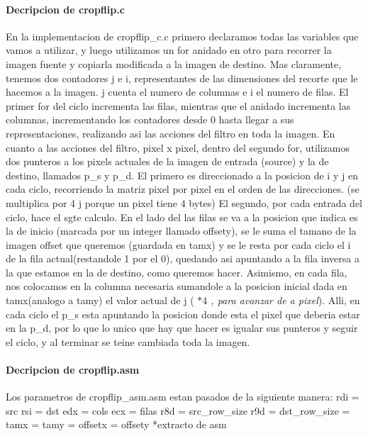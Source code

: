 \documentclass[a4paper]{article}
\begin{document}
\paragraph{\textbf{Decripcion de cropflip.c}}
\hfill \break
	En la implementacion de cropflip_c.c primero declaramos todas las variables que vamos a utilizar, y luego  utilizamos un for anidado en otro para recorrer la imagen fuente y copiarla modificada a la imagen de destino.
\hfill \break
	Mas claramente, tenemos dos contadores j e i, representantes de las dimensiones del recorte que le hacemos a la imagen. j cuenta el numero de columnas e i el numero de filas. El primer for del ciclo incrementa las filas, mientras que el anidado incrementa las columnas, incrementando los contadores desde 0 hasta llegar a sus representaciones, realizando asi las acciones del filtro en toda la imagen.
\hfill \break	
	 En cuanto a las acciones del filtro, pixel x pixel, dentro del segundo for, utilizamos dos punteros a los pixels actuales de la imagen de entrada (source) y la  de destino, llamados p_s y p_d.
\hfill \break 
	 El primero es direccionado a la posicion de i y j en cada ciclo, recorriendo la matriz pixel por pixel en el orden de las direcciones. (se multiplica por 4 j porque un pixel tiene 4 bytes) El segundo, por cada entrada del ciclo, hace el sgte calculo. En el lado del las filas se va a la posicion que indica es la de inicio (marcada por un integer llamado offsety), se le suma el tamano de la imagen offset que queremos (guardada en tamx) y se le resta por cada ciclo el i de la fila actual(restandole 1 por el 0), quedando asi apuntando a la fila inversa a la que estamos en la de destino, como queremos hacer. Asimismo, en cada fila, nos colocamos en la columna necesaria sumandole a la posicion inicial dada en tamx(analogo a tamy) el valor actual de j (\textit{ $*4$ , para avanzar de a pixel}).
	 \hfill \break
Alli, en cada ciclo el p_s esta apuntando la posicion donde esta el pixel que deberia estar en la p_d, por lo que lo unico que hay que hacer es igualar sus punteros y seguir el ciclo, y al terminar se teine cambiada toda la imagen.
\hfill \break

\paragraph{\textbf{Decripcion de cropflip.asm}}
\hfill \break
	
 	Los parametros de cropflip_asm.asm estan pasados de la siguiente manera:
 	\hfill \break
 	 rdi = src
 	 \hfill \break
     rsi = dst
     \hfill \break 
     edx = cols
     \hfill \break
     ecx = filas
     \hfill \break
     r8d = src_row_size
     \hfill \break
     r9d = dst_row_size
     \hfill \break
     [rsp+8] = tamx
     \hfill \break
     [rsp+16] = tamy
     \hfill \break
     [rsp+24] = offsetx
     \hfill \break
     [rsp+32] = offsety
     \hfill \break
  *extracto de asm
  \hfill \break
     
\end{document}
